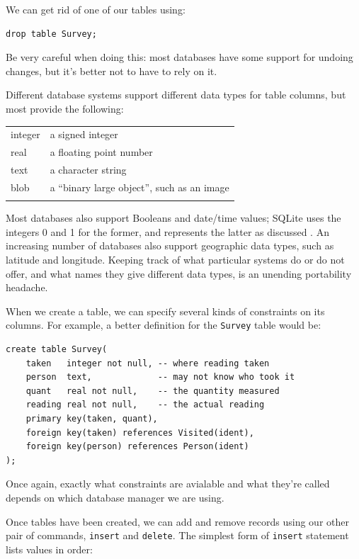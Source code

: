 \documentclass{book}
\begin{document}
We can get rid of one of our tables using:

\begin{verbatim}
drop table Survey;
\end{verbatim}

Be very careful when doing this: most databases have some support for
undoing changes, but it's better not to have to rely on it.

Different database systems support different data types for table
columns, but most provide the following:

\begin{tabular}{@{}ll@{}}
\hline\noalign{\medskip}
integer & a signed integer
\\\noalign{\medskip}
real & a floating point number
\\\noalign{\medskip}
text & a character string
\\\noalign{\medskip}
blob & a ``binary large object'', such as an image
\\\noalign{\medskip}
\hline
\end{tabular}

Most databases also support Booleans and date/time values; SQLite uses
the integers 0 and 1 for the former, and represents the latter as
discussed . An increasing number of databases
also support geographic data types, such as latitude and longitude.
Keeping track of what particular systems do or do not offer, and what
names they give different data types, is an unending portability
headache.

When we create a table, we can specify several kinds of constraints on
its columns. For example, a better definition for the \texttt{Survey}
table would be:

\begin{verbatim}
create table Survey(
    taken   integer not null, -- where reading taken
    person  text,             -- may not know who took it
    quant   real not null,    -- the quantity measured
    reading real not null,    -- the actual reading
    primary key(taken, quant),
    foreign key(taken) references Visited(ident),
    foreign key(person) references Person(ident)
);
\end{verbatim}

Once again, exactly what constraints are avialable and what they're
called depends on which database manager we are using.

Once tables have been created, we can add and remove records using our
other pair of commands, \texttt{insert} and \texttt{delete}. The
simplest form of \texttt{insert} statement lists values in order:
\end{document}
